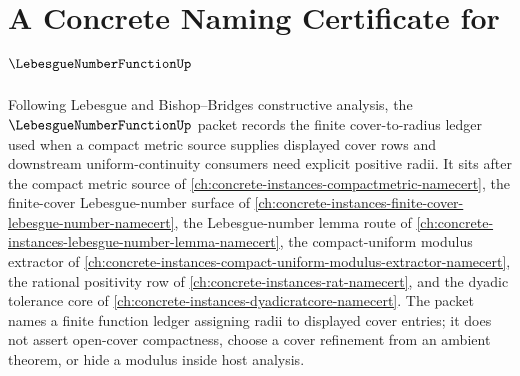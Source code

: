 \chapter{A Concrete Naming Certificate for $\LebesgueNumberFunctionUp$}
\label{ch:concrete-instances-lebesgue-number-function-namecert}

Following Lebesgue and Bishop--Bridges constructive analysis, the $\LebesgueNumberFunctionUp$ packet records the finite cover-to-radius ledger used when a compact metric source supplies displayed cover rows and downstream uniform-continuity consumers need explicit positive radii. It sits after the compact metric source of \autoref{ch:concrete-instances-compactmetric-namecert}, the finite-cover Lebesgue-number surface of \autoref{ch:concrete-instances-finite-cover-lebesgue-number-namecert}, the Lebesgue-number lemma route of \autoref{ch:concrete-instances-lebesgue-number-lemma-namecert}, the compact-uniform modulus extractor of \autoref{ch:concrete-instances-compact-uniform-modulus-extractor-namecert}, the rational positivity row of \autoref{ch:concrete-instances-rat-namecert}, and the dyadic tolerance core of \autoref{ch:concrete-instances-dyadicratcore-namecert}. The packet names a finite function ledger assigning radii to displayed cover entries; it does not assert open-cover compactness, choose a cover refinement from an ambient theorem, or hide a modulus inside host analysis.

